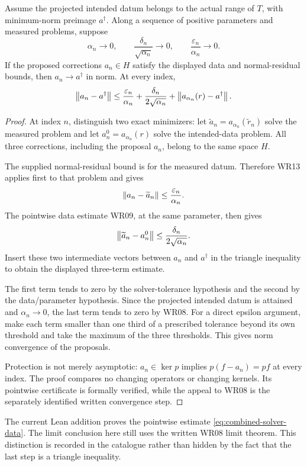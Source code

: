 \begin{theorem}\label{WR16}
Assume the projected intended datum belongs to the actual range of $T$, with minimum-norm preimage $a^\dagger$. Along a sequence of positive parameters and measured problems, suppose
\[
 \alpha_n\to0,\qquad
 \frac{\delta_n}{\sqrt{\alpha_n}}\to0,\qquad
 \frac{\varepsilon_n}{\alpha_n}\to0.
\]
If the proposed corrections $a_n\in H$ satisfy the displayed data and normal-residual bounds, then $a_n\to a^\dagger$ in norm. At every index,
\[
 \left\lVert a_n-a^\dagger\right\rVert
 \le\frac{\varepsilon_n}{\alpha_n}
      +\frac{\delta_n}{2\sqrt{\alpha_n}}
      +\left\lVert a_{\alpha_n}(r)-a^\dagger\right\rVert.
\]
\end{theorem}
\begin{proof}
At index $n$, distinguish two exact minimizers: let $\widetilde a_n=a_{\alpha_n}(\widetilde r_n)$ solve the measured problem and let $a_n^0=a_{\alpha_n}(r)$ solve the intended-data problem. All three corrections, including the proposal $a_n$, belong to the same space $H$.

The supplied normal-residual bound is for the measured datum. Therefore WR13 applies first to that problem and gives
\[
 \left\lVert a_n-\widetilde a_n\right\rVert\le\frac{\varepsilon_n}{\alpha_n}.
\]
The pointwise data estimate WR09, at the same parameter, then gives
\[
 \left\lVert\widetilde a_n-a_n^0\right\rVert\le\frac{\delta_n}{2\sqrt{\alpha_n}}.
\]
Insert these two intermediate vectors between $a_n$ and $a^\dagger$ in the triangle inequality to obtain the displayed three-term estimate.

The first term tends to zero by the solver-tolerance hypothesis and the second by the data/parameter hypothesis. Since the projected intended datum is attained and $\alpha_n\to0$, the last term tends to zero by WR08. For a direct epsilon argument, make each term smaller than one third of a prescribed tolerance beyond its own threshold and take the maximum of the three thresholds. This gives norm convergence of the proposals.

Protection is not merely asymptotic: $a_n\in\ker p$ implies $p(f-a_n)=pf$ at every index. The proof compares no changing operators or changing kernels. Its pointwise certificate is formally verified, while the appeal to WR08 is the separately identified written convergence step.
\end{proof}

The current Lean addition proves the pointwise estimate \eqref{eq:combined-solver-data}. The limit conclusion here still uses the written WR08 limit theorem. This distinction is recorded in the catalogue rather than hidden by the fact that the last step is a triangle inequality.

